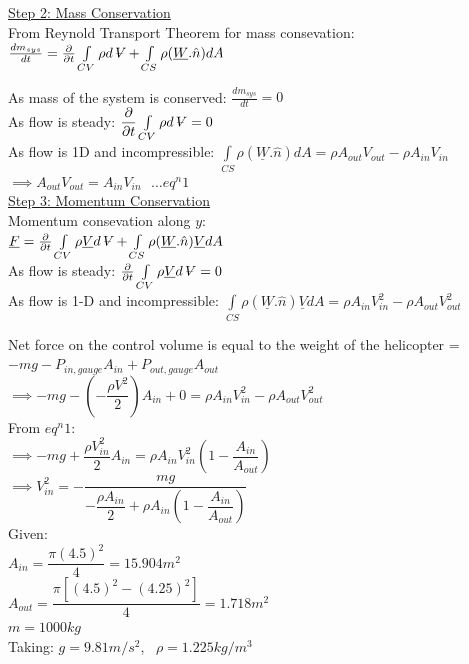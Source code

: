 \documentclass{article}
\newcommand{\volume}{\mathop{\ooalign{\hfil$V$\hfil\cr\kern0.08em--\hfil\cr}}\nolimits}
\begin{document}
\noindent \underline{Step 2: Mass Conservation}\\

\noindent From Reynold Transport Theorem for mass consevation:\ 
$\frac{dm_{sys}}{dt}= \frac{\partial}{\partial t} \int\limits_{CV} \rho d\volume + \int\limits_{CS} \rho (\underline{W}.\hat{n})dA $

\noindent As mass of the system is conserved: $\frac{dm_{sys}}{dt}=0$ \\ 
As flow is steady: $\dfrac{\partial}{\partial t} \int\limits_{CV} \rho d\volume =0$\\
As flow is 1D and incompressible: $\int\limits_{CS} \rho (\underline{W}.\hat{n})dA= \rho A_{out}V_{out} - \rho A_{in}V_{in}$\\
$\implies A_{out}V_{out}= A_{in}V_{in} \ \ \ \hdots eq^n 1$\\

\noindent \underline{Step 3: Momentum Conservation}\\

\noindent Momentum consevation along $y$:\\ 
$\underline{F}= \frac{\partial}{\partial t} \int\limits_{CV} \rho\underline{V} d\volume + \int\limits_{CS} \rho (\underline{W}.\hat{n})\underline{V}dA $\\

\noindent As flow is steady: $\frac{\partial}{\partial t} \int\limits_{CV} \rho\underline{V} d\volume=0$\\
As flow is 1-D and incompressible: $\int\limits_{CS} \rho (\underline{W}.\hat{n})\underline{V}dA= \rho A_{in} V_{in}^2- \rho A_{out}V_{out}^2$

\noindent Net force on the control volume is equal to the weight of the helicopter = $-mg-P_{in,gauge}A_{in}+P_{out,gauge}A_{out}$\\
$\implies -mg-(-\dfrac{\rho V^2}{2})A_{in}+0= \rho A_{in} V_{in}^2- \rho A_{out}V_{out}^2 $\\
From $eq^n 1$: \\
$\implies -mg+\dfrac{\rho V_{in}^2}{2}A_{in}= \rho A_{in}V_{in}^2(1-\dfrac{A_{in}}{A_{out}})$\\
$\implies V_{in}^2= -\dfrac{mg}{-\dfrac{\rho A_{in}}{2} + \rho A_{in}(1-\dfrac{A_{in}}{A_{out}})}$\\

\noindent Given: \\
${A_{in}=\dfrac{\pi (4.5)^2}{4}} = 15.904 m^2$ \\
$A_{out}= \dfrac{\pi[(4.5)^2- (4.25)^2]}{4} = 1.718 m^2 $\\
$m=1000kg$\\
Taking: 
$g=9.81m/s^2$, \
$\rho = 1.225 kg/m^3$
\end{document}
